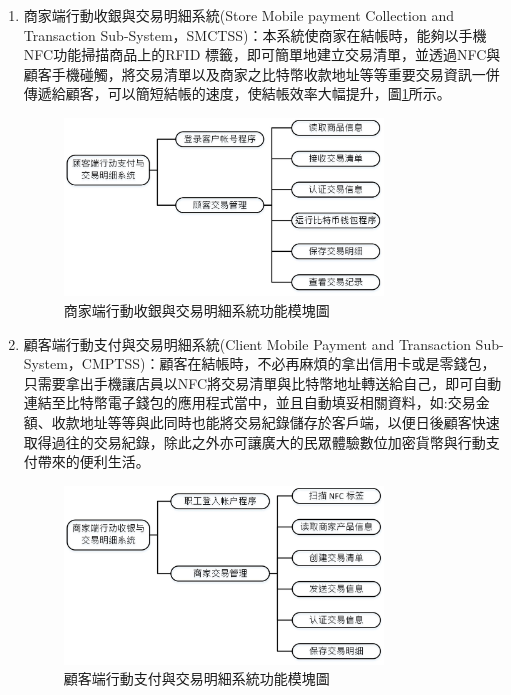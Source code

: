 \begin{enumerate}
		\item 商家端行動收銀與交易明細系統(Store Mobile payment Collection and Transaction Sub-System，SMCTSS)：本系統使商家在結帳時，能夠以手機NFC功能掃描商品上的RFID 標籤，即可簡單地建立交易清單，並透過NFC與顧客手機碰觸，將交易清單以及商家之比特幣收款地址等等重要交易資訊一併傳遞給顧客，可以簡短結帳的速度，使結帳效率大幅提升，圖\ref{model2}所示。
		 
			\begin{figure}[htbp]
			\centering
			\includegraphics[width = 0.8\textwidth]{model2.jpg}
			\caption{商家端行動收銀與交易明細系統功能模塊圖}\label{model2}
			\end{figure}


		\item 顧客端行動支付與交易明細系統(Client Mobile Payment and Transaction Sub-System，CMPTSS)：顧客在結帳時，不必再麻煩的拿出信用卡或是零錢包，只需要拿出手機讓店員以NFC將交易清單與比特幣地址轉送給自己，即可自動連結至比特幣電子錢包的應用程式當中，並且自動填妥相關資料，如:交易金額、收款地址等等與此同時也能將交易紀錄儲存於客戶端，以便日後顧客快速取得過往的交易紀錄，除此之外亦可讓廣大的民眾體驗數位加密貨幣與行動支付帶來的便利生活。
			\begin{figure}[htbp]
			\centering
			\includegraphics[width = 0.8\textwidth]{model3.jpg}
			\caption{顧客端行動支付與交易明細系統功能模塊圖}\label{model3}
			\end{figure}
		
	\end{enumerate}

